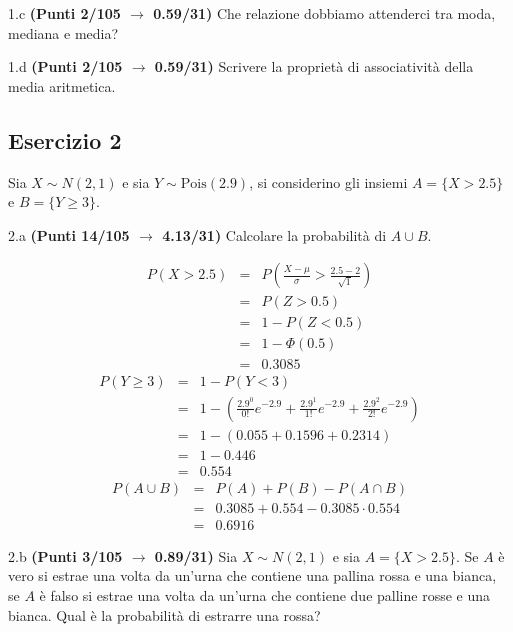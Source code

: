 \documentclass[
  11pt,
]{book}
\theoremstyle{mytheoremstyle}
\theoremstyle{mydefstyle}
\newenvironment{sol}
  {
  \begin{tcolorbox}[enhanced,breakable,arc=0.1mm,boxrule=1pt,colback=white,colframe=iblue,
  title=\bf \fontfamily{lmss}\selectfont \hspace{.5 cm} Soluzione,drop fuzzy shadow]

}{
\end{tcolorbox}
  }
\begin{document}
1.c \textbf{(Punti 2/105 \(\rightarrow\) 0.59/31)} Che relazione dobbiamo attenderci tra moda, mediana e media?

1.d \textbf{(Punti 2/105 \(\rightarrow\) 0.59/31)} Scrivere la proprietà di associatività della media aritmetica.

\subsection{Esercizio 2}\label{esercizio-2-30}

Sia \(X\sim N(2,1)\) e sia \(Y\sim\text{Pois}(2.9)\), si considerino gli insiemi
\(A=\{X>2.5\}\) e \(B=\{Y\geq 3\}\).

2.a \textbf{(Punti 14/105 \(\rightarrow\) 4.13/31)} Calcolare la probabilità di \(A\cup B\).

\begin{sol}
\begin{eqnarray*}
      P( X   >   2.5 ) 
        &=& P\left(  \frac { X  -  \mu }{ \sigma }  >  \frac { 2.5  -  2 }{\sqrt{ 1 }} \right)  \\
                 &=& P\left(  Z   >   0.5 \right) \\    &=& 1-P(Z< 0.5 )\\ 
                 &=&  1-\Phi( 0.5 ) \\ &=&  0.3085 
      \end{eqnarray*}\begin{eqnarray*}
   P( Y \geq 3 ) &=& 1-P( Y < 3 ) \\                 &=& 1-\left( \frac{ 2.9 ^{ 0 }}{ 0 !}e^{- 2.9 }+\frac{ 2.9 ^{ 1 }}{ 1 !}e^{- 2.9 }+\frac{ 2.9 ^{ 2 }}{ 2 !}e^{- 2.9 } \right)\\                 &=& 1-( 0.055+0.1596+0.2314 )\\                 &=& 1- 0.446 \\                 &=&   0.554 
\end{eqnarray*}
\begin{eqnarray*}
  P(A\cup B) &=&  P(A)+P(B)-P(A\cap B)\\
  &=& 0.3085+0.554-0.3085\cdot0.554\\
  &=& 0.6916
\end{eqnarray*}

\end{sol}

2.b \textbf{(Punti 3/105 \(\rightarrow\) 0.89/31)} Sia \(X\sim N(2,1)\) e sia \(A=\{X>2.5\}\).
Se \(A\) è vero si estrae una volta da un'urna che contiene una pallina rossa e una bianca,
se \(A\) è falso si estrae una volta da un'urna che contiene due palline rosse e una bianca.
Qual è la probabilità di estrarre una rossa?
\end{document}
